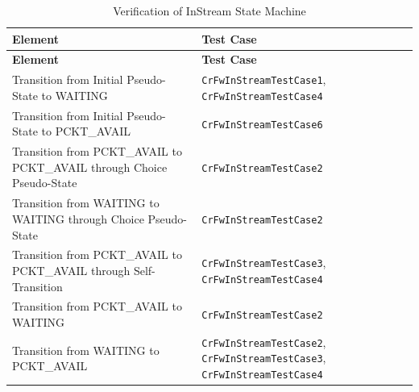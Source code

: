 \documentclass[a4paper,10pt]{article}
\begin{document}
\begin{longtable}{|>{\raggedright}p{6.0cm}|P{5.0cm}|}
\caption{Verification of InStream State Machine}
\label{tab:verInStreamSM}\\
\hline
{}
\textbf{Element} & \textbf{Test Case} \\
\hline
\endfirsthead
{}
\textbf{Element} & \textbf{Test Case} \\
\hline
\endhead
Transition from Initial Pseudo-State to WAITING  & \texttt{CrFwInStreamTestCase1}, \texttt{CrFwInStreamTestCase4}\\
\hline
Transition from Initial Pseudo-State to PCKT\_AVAIL  & \texttt{CrFwInStreamTestCase6}\\
\hline
Transition from PCKT\_AVAIL to PCKT\_AVAIL through Choice Pseudo-State  & \texttt{CrFwInStreamTestCase2}\\
\hline
Transition from WAITING to WAITING through Choice Pseudo-State  & \texttt{CrFwInStreamTestCase2}\\
\hline
Transition from PCKT\_AVAIL to PCKT\_AVAIL through Self-Transition  & \texttt{CrFwInStreamTestCase3}, \texttt{CrFwInStreamTestCase4}\\
\hline
Transition from PCKT\_AVAIL to WAITING  & \texttt{CrFwInStreamTestCase2}\\
\hline
Transition from WAITING to PCKT\_AVAIL  & \texttt{CrFwInStreamTestCase2}, \texttt{CrFwInStreamTestCase3}, \texttt{CrFwInStreamTestCase4}\\
\hline
\end{longtable}
\end{document}
